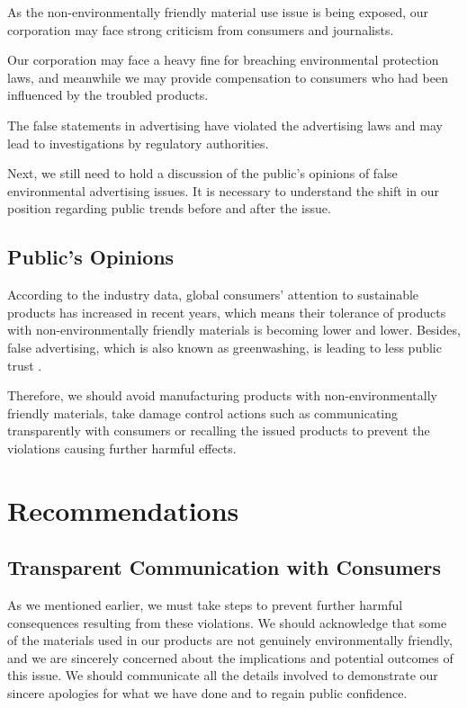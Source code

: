 \documentclass[12pt]{article}
\begin{document}
\begin{description}[leftmargin=2.8cm,style=nextline]
  \item[Reputation risks] As the non-environmentally friendly material use issue is being exposed, our corporation may face strong criticism from consumers and journalists.
  \item[Finance risks] Our corporation may face a heavy fine for breaching environmental protection laws, and meanwhile we may provide compensation to consumers who had been influenced by the troubled products.
  \item[Compliance risks] The false statements in advertising have violated the advertising laws and may lead to investigations by regulatory authorities.
\end{description}

Next, we still need to hold a discussion of the public's opinions of false environmental advertising issues. It is necessary to understand the shift in our position regarding public trends before and after the issue.

\subsection{Public's Opinions}

According to the industry data, global consumers' attention to sustainable products has increased in recent years, which means their tolerance of products with non-environmentally friendly materials is becoming lower and lower. Besides, false advertising, which is also known as greenwashing, is leading to less public trust \citep{greenpeace2021greenwashers}.

Therefore, we should avoid manufacturing products with non-environmentally friendly materials, take damage control actions such as communicating transparently with consumers or recalling the issued products to prevent the violations causing further harmful effects.

\section{Recommendations}

\subsection{Transparent Communication with Consumers}

As we mentioned earlier, we must take steps to prevent further harmful consequences resulting from these violations. We should acknowledge that some of the materials used in our products are not genuinely environmentally friendly, and we are sincerely concerned about the implications and potential outcomes of this issue. We should communicate all the details involved to demonstrate our sincere apologies for what we have done and to regain public confidence.
\end{document}
